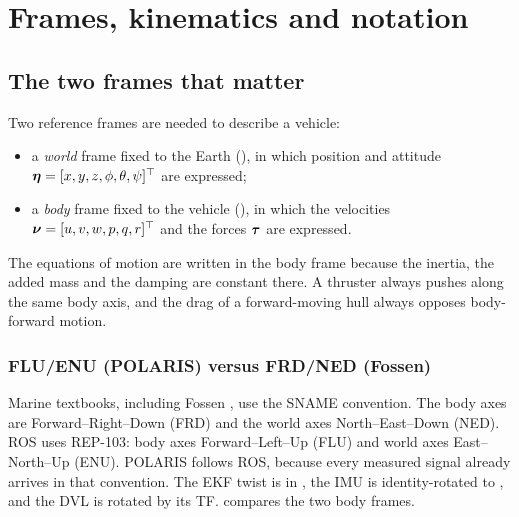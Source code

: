\chapter{Frames, kinematics and notation}
\label{ch:frames}

\section{The two frames that matter}

Two reference frames are needed to describe a vehicle:
\begin{itemize}
  \item a \emph{world} frame fixed to the Earth (), in which position and attitude
        $\boldsymbol{\eta} = [x, y, z, \phi, \theta, \psi]^\top$ are expressed;
  \item a \emph{body} frame fixed to the vehicle (), in which the velocities
        $\boldsymbol{\nu} = [u, v, w, p, q, r]^\top$ and the forces $\boldsymbol{\tau}$ are expressed.
\end{itemize}
The equations of motion are written in the body frame because the inertia, the added mass
and the damping are constant there. A thruster always pushes along the same body axis,
and the drag of a forward-moving hull always opposes body-forward motion.

\subsection{FLU/ENU (POLARIS) versus FRD/NED (Fossen)}

Marine textbooks, including Fossen \cite{fossen2011}, use the SNAME convention. The body
axes are Forward--Right--Down (FRD) and the world axes North--East--Down (NED). ROS uses
REP-103: body axes Forward--Left--Up (FLU) and world axes East--North--Up (ENU). POLARIS
follows ROS, because every measured signal already arrives in that convention. The EKF
twist is in , the IMU is identity-rotated to , and the DVL is
rotated by its TF.  compares the two body frames.

